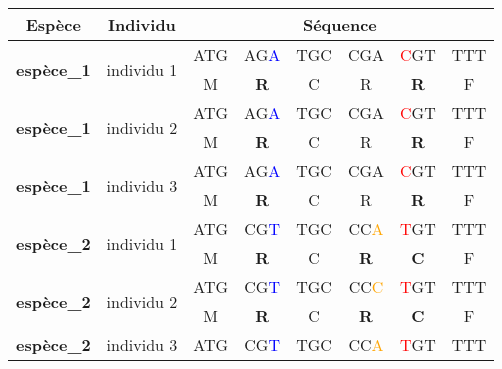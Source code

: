 \documentclass[../main]{subfiles} %
\begin{document}



\begin{table}[]
    \centering
    \begin{tabular}{cccccccc}
        \toprule
        \textbf{Espèce}                     & \textbf{Individu}             & \multicolumn{6}{c}{\textbf{Séquence}} \\
        \midrule
        \multirow{2}{*}{\textbf{espèce\_1}} & \multirow{2}{*}{individu 1} & ATG  & AG\textcolor{blue}{A}  & TGC  & CGA  & \textcolor{red}{C}GT & TTT \\
                                            &                               & M    & \textbf{R}    & C    & R    & \textbf{R}   & F   \\
        \midrule
        \multirow{2}{*}{\textbf{espèce\_1}} & \multirow{2}{*}{individu 2}   & ATG  & AG\textcolor{blue}{A} & TGC  & CGA  & \textcolor{red}{C}GT & TTT \\
                                            &                               & M    & \textbf{R}    & C    & R    & \textbf{R}   & F   \\
        \midrule
        \multirow{2}{*}{\textbf{espèce\_1}} & \multirow{2}{*}{individu 3}   & ATG  & AG\textcolor{blue}{A}  & TGC  & CGA  & \textcolor{red}{C}GT & TTT \\
                                            &                               & M    & \textbf{R}    & C    & R    & \textbf{R}   & F   \\
        \midrule
        \multirow{2}{*}{\textbf{espèce\_2}} & \multirow{2}{*}{individu 1}   & ATG  & CG\textcolor{blue}{T}  & TGC  & CC\textcolor{orange}{A}  & \textcolor{red}{T}GT & TTT \\
                                            &                               & M    & \textbf{R}    & C    & \textbf{R}    & \textbf{C}   & F   \\
        \midrule
        \multirow{2}{*}{\textbf{espèce\_2}} & \multirow{2}{*}{individu 2}   & ATG  & CG\textcolor{blue}{T}  & TGC  & CC\textcolor{orange}{C}  & \textcolor{red}{T}GT & TTT \\
                                            &                               & M    & \textbf{R}    & C    & \textbf{R}    & \textbf{C}   & F   \\
        \midrule
        \multirow{2}{*}{\textbf{espèce\_2}} & \multirow{2}{*}{individu 3}   & ATG  & CG\textcolor{blue}{T}  & TGC  & CC\textcolor{orange}{A}  & \textcolor{red}{T}GT & TTT \\

\end{tabular}
\end{table}
\end{document}
